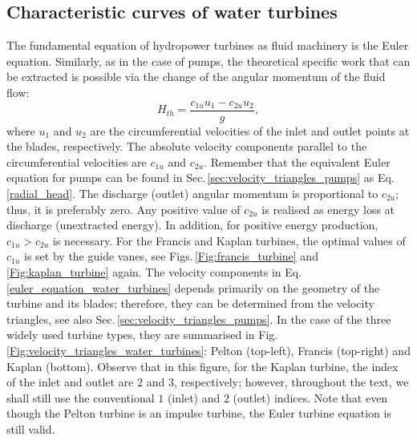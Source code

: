 \subsection{Characteristic curves of water turbines}
The fundamental equation of hydropower turbines as fluid machinery is the Euler equation. Similarly, as in the case of pumps, the theoretical specific work that can be extracted is possible via the change of the angular momentum of the fluid flow:
%
\begin{equation} \label{euler_equation_water_turbines}
H_{th} = \frac{c_{1u} u_1 - c_{2u} u_2}{g},
\end{equation}
%
where $u_1$ and $u_2$ are the circumferential velocities of the inlet and outlet points at the blades, respectively. The absolute velocity components parallel to the circumferential velocities are $c_{1u}$ and $c_{2u}$. Remember that the equivalent Euler equation for pumps can be found in Sec.\,\ref{sec:velocity_triangles_pumps} as Eq.\,\ref{radial_head}. The discharge (outlet) angular momentum is proportional to $c_{2u}$; thus, it is preferably zero. Any positive value of $c_{2u}$ is realised as energy loss at discharge (unextracted energy). In addition, for positive energy production, $c_{1u}>c_{2u}$ is necessary. For the Francis and Kaplan turbines, the optimal values of $c_{1u}$ is set by the guide vanes, see Figs.\,\ref{Fig:francis_turbine} and \ref{Fig:kaplan_turbine} again. The velocity components in Eq.\,\ref{euler_equation_water_turbines} depends primarily on the geometry of the turbine and its blades; therefore, they can be determined from the velocity triangles, see also Sec.\,\ref{sec:velocity_triangles_pumps}. In the case of the three widely used turbine types, they are summarised in Fig.\,\ref{Fig:velocity_triangles_water_turbines}: Pelton (top-left), Francis (top-right) and Kaplan (bottom). Observe that in this figure, for the Kaplan turbine, the index of the inlet and outlet are $2$ and $3$, respectively; however, throughout the text, we shall still use the conventional $1$ (inlet) and $2$ (outlet) indices. Note that even though the Pelton turbine is an impulse turbine, the Euler turbine equation is still valid.

